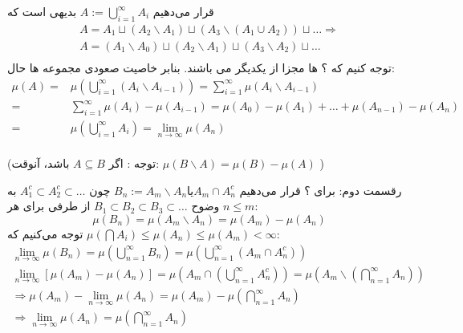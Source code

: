 \pf
قرار می‌دهیم 
$ A := \bigcup_{i = 1}^{\infty} A_i $
بدیهی است که 
\begin{equation*}
\begin{split}
A = A_1 \sqcup (A_2 \backslash A_1) \sqcup (A_3 \backslash (A_1 \cup A_2)) \sqcup \ldots \Rightarrow \\
A = (A_1 \backslash A_0) \sqcup (A_2 \backslash A_1) \sqcup (A_3 \backslash A_2) \sqcup \ldots \\
\end{split}
\end{equation*}
توجه کنیم که ؟ ها مجزا از یکدیگر می باشند. بنابر خاصیت صعودی مجموعه ها حال:
\begin{equation*}
\begin{split}
\mu(A) =& \mu(\bigcup_{i = 1}^{\infty} (A_i \backslash A_{i-1})) = \sum_{i = 1}^{\infty} \mu(A_i \backslash A_{i - 1}) \\
           =& \sum_{i = 1}^{\infty} \mu(A_i) - \mu(A_{i - 1}) = \mu(A_0) - \mu(A_1) + \ldots + \mu(A_{n - 1}) - \mu(A_n) \\
           =& \mu(\bigcup_{i = 1}^{\infty} A_i) = \lim_{n \rightarrow \infty} \mu(A_n) \\
\end{split}
\end{equation*}

(توجه : اگر
$ A \subseteq B $
باشد، آنوقت:
$ \mu(B \backslash A) = \mu(B) - \mu(A) $
)

\pf
رقسمت دوم: برای ؟ قرار می‌دهیم
$ B_n := A_m \backslash A_n \textit{یا} A_m \cap A_n^c $
چون 
$ A_1^c \subset A_2^c \subset \ldots $
به وضوح
$ B_1 \subset B_2 \subset B_3 \subset \ldots $
از طرفی برای هر 
$ n \leq m $:
\begin{equation*}
\mu(B_n) = \mu(A_m \backslash A_n) = \mu(A_m) - \mu(A_n)
\end{equation*} 
توجه می‌کنیم که 
$ \mu(\bigcap A_i) \leq \mu(A_n) \leq \mu(A_m) < \infty $:
\begin{equation*}
\begin{split}
\lim_{n \rightarrow \infty} \mu(B_n) = \mu(\bigcup_{n = 1}^{\infty} B_n) = \mu(\bigcup_{n = 1}^{\infty} (A_m \cap A_n^c)) \\
\lim_{n \rightarrow \infty} [\mu(A_m) - \mu(A_n)] = \mu(A_m \cap (\bigcup_{n = 1}^{\infty} A_n^c)) = \mu(A_m \backslash (\bigcap_{n = 1}^{\infty} A_n)) \\
\Rightarrow \mu(A_m) - \lim_{n \rightarrow \infty} \mu(A_n) = \mu(A_m) - \mu(\bigcap_{n = 1}^{\infty} A_n) \\
\Rightarrow \lim_{n \rightarrow \infty} \mu(A_n) = \mu(\bigcap_{n = 1}^{\infty} A_n)
\end{split}
\end{equation*}

